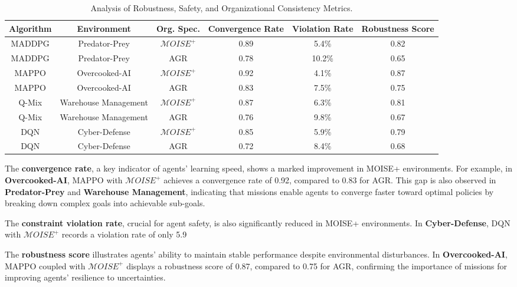 \documentclass[sigconf,anonymous]{aamas}
\begin{document}
\begin{table*}[h!]
    \centering
    \caption{Analysis of Robustness, Safety, and Organizational Consistency Metrics.}
    \label{tab:other_metrics}
    \begin{tabular}{|c|c|c|c|c|c|}
        \hline
        \textbf{Algorithm} & \textbf{Environment} & \textbf{Org. Spec.} & \textbf{Convergence Rate} & \textbf{Violation Rate} & \textbf{Robustness Score} \\ \hline
        MADDPG & Predator-Prey & $\mathcal{M}OISE^+$ & 0.89 & 5.4\% & 0.82 \\ \hline
        MADDPG & Predator-Prey & AGR & 0.78 & 10.2\% & 0.65 \\ \hline
        MAPPO & Overcooked-AI & $\mathcal{M}OISE^+$ & 0.92 & 4.1\% & 0.87 \\ \hline
        MAPPO & Overcooked-AI & AGR & 0.83 & 7.5\% & 0.75 \\ \hline
        Q-Mix & Warehouse Management & $\mathcal{M}OISE^+$ & 0.87 & 6.3\% & 0.81 \\ \hline
        Q-Mix & Warehouse Management & AGR & 0.76 & 9.8\% & 0.67 \\ \hline
        DQN & Cyber-Defense & $\mathcal{M}OISE^+$ & 0.85 & 5.9\% & 0.79 \\ \hline
        DQN & Cyber-Defense & AGR & 0.72 & 8.4\% & 0.68 \\ \hline
    \end{tabular}
\end{table*}

The \textbf{convergence rate}, a key indicator of agents' learning speed, shows a marked improvement in MOISE+ environments. For example, in \textbf{Overcooked-AI}, MAPPO with $\mathcal{M}OISE^+$ achieves a convergence rate of 0.92, compared to 0.83 for AGR. This gap is also observed in \textbf{Predator-Prey} and \textbf{Warehouse Management}, indicating that missions enable agents to converge faster toward optimal policies by breaking down complex goals into achievable sub-goals.

The \textbf{constraint violation rate}, crucial for agent safety, is also significantly reduced in MOISE+ environments. In \textbf{Cyber-Defense}, DQN with $\mathcal{M}OISE^+$ records a violation rate of only 5.9%

The \textbf{robustness score} illustrates agents' ability to maintain stable performance despite environmental disturbances. In \textbf{Overcooked-AI}, MAPPO coupled with $\mathcal{M}OISE^+$ displays a robustness score of 0.87, compared to 0.75 for AGR, confirming the importance of missions for improving agents' resilience to uncertainties.
\end{document}
